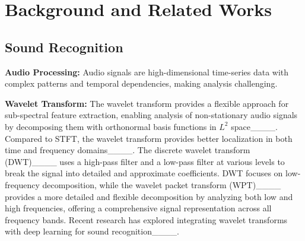 \section{Background and Related Works}
\label{sec:background-and-related-works}


\subsection{Sound Recognition}
\label{sec:sound-recognition}
\noindent
\textbf{Audio Processing:} Audio signals are high-dimensional time-series data with complex patterns and temporal dependencies, making analysis challenging. 

\noindent
\textbf{Wavelet Transform:}
The wavelet transform provides a flexible approach for sub-spectral feature extraction, enabling analysis of non-stationary audio signals by decomposing them with orthonormal basis functions in $L^2$ space____. Compared to STFT, the wavelet transform provides better localization in both time and frequency domains____. The discrete wavelet transform (DWT)____ uses a high-pass filter and a low-pass filter at various levels to break the signal into detailed and approximate coefficients.
DWT focuses on low-frequency decomposition, while the wavelet packet transform (WPT)____ provides a more detailed and flexible decomposition by analyzing both low and high frequencies, offering a comprehensive signal representation across all frequency bands. Recent research has explored integrating wavelet transforms with deep learning for sound recognition____. 

